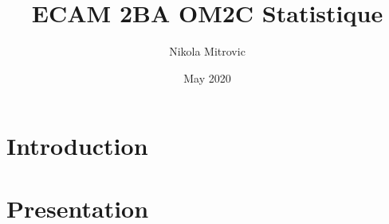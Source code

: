 \documentclass{article}
\title{ECAM 2BA OM2C Statistique}
\author{Nikola Mitrovic}
\date{May 2020}
\begin{document}
\maketitle

\section{Introduction}
\section{Presentation}
\end{document}
